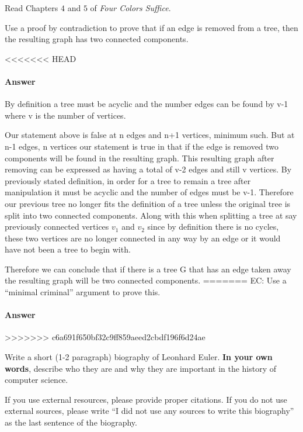 \documentclass{article}
\begin{document}
Read Chapters $4$ and $5$ of \emph{Four Colors Suffice}.

Use a proof by contradiction to prove that if an edge is removed from a
tree, then the resulting graph has two connected components.

<<<<<<< HEAD
\paragraph{Answer}
By definition a tree must be acyclic and the number edges can be found by v-1
where v is the number of vertices.

Our statement above is false at n edges and n+1 vertices, minimum such. But at
n-1 edges, n vertices our statement is true in that if the edge is removed two components will
be found in the resulting graph. This resulting graph after removing can be
expressed as having a total of v-2 edges and still v vertices. By previously
stated definition, in order for a tree to remain a tree after manipulation it must
be acyclic and the number of edges must be v-1. Therefore our previous tree no
longer fits the definition of a tree unless the original tree is split into two
connected components. Along with this when splitting a tree at say previously
connected vertices $v_1$ and $v_2$ since by definition there is no cycles, these
two vertices are no longer connected in any way by an edge or it would have not
been a tree to begin with.

Therefore we can conclude that if there is a tree G that has an edge taken away
the resulting graph will be two connected components.
=======
EC:
Use a ``minimal criminal'' argument to prove this.

        \paragraph{Answer}
>>>>>>> c6a691f650bf32c9ff859aeed2cbdf196f6d24ae



Write a short (1-2 paragraph) biography of Leonhard Euler.
\textbf{In your own words}, describe who they are and why they are important in
the history of computer science.

If you use external resources, please provide
proper citations. If you do not use external sources, please write ``I did not
use any sources to write this biography'' as the last sentence of the
biography.
\end{document}
